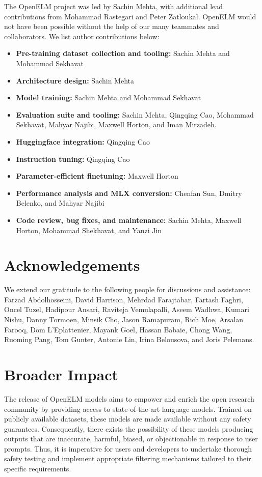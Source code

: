 \documentclass[10pt,twocolumn,letterpaper]{article}
\makeatletter
\newcommand{\model}{OpenELM\@\xspace}
\makeatother
\begin{document}
The \model project was led by Sachin Mehta, with additional lead contributions from Mohammad Rastegari and Peter Zatloukal. \model would not have been possible without the help of our many teammates and collaborators. We list author contributions below:

\begin{itemize}[leftmargin=*]
    \item[] \textbf{Pre-training dataset collection and tooling:} Sachin Mehta and Mohammad Sekhavat
    \item[] \textbf{Architecture design:} Sachin Mehta
    \item[] \textbf{Model training:} Sachin Mehta and Mohammad Sekhavat
    \item[] \textbf{Evaluation suite and tooling:} Sachin Mehta, Qingqing Cao, Mohammad Sekhavat, Mahyar Najibi, Maxwell Horton, and Iman Mirzadeh.
    \item[] \textbf{Huggingface integration:} Qingqing Cao
    \item[] \textbf{Instruction tuning:} Qingqing Cao
    \item[] \textbf{Parameter-efficient finetuning:} Maxwell Horton
    \item[] \textbf{Performance analysis and MLX conversion:} Chenfan Sun, Dmitry Belenko, and Mahyar Najibi
    \item[] \textbf{Code review, bug fixes, and  maintenance:} Sachin Mehta, Maxwell Horton, Mohammad Shekhavat, and Yanzi Jin
\end{itemize}

\section*{Acknowledgements}
We extend our gratitude to the following people for discussions and assistance: Farzad Abdolhosseini, David Harrison, Mehrdad Farajtabar, Fartash Faghri, Oncel Tuzel,  Hadipour Ansari,  Raviteja Vemulapalli, Aseem Wadhwa, Kumari Nishu, Danny Tormoen, Minsik Cho, Jason Ramapuram, Rich Moe, Arsalan Farooq, Dom L'Eplattenier, Mayank Goel, Hassan Babaie, Chong Wang, Ruoming Pang, Tom Gunter, Antonie Lin, Irina Belousova, and Joris Pelemans.

\section*{Broader Impact}
The release of \model models aims to empower and enrich the open research community by providing access to state-of-the-art language models. Trained on publicly available datasets, these models are made available without any safety guarantees. Consequently, there exists the possibility of these models producing outputs that are inaccurate, harmful, biased, or objectionable in response to user prompts. Thus, it is imperative for users and developers to undertake thorough safety testing and implement appropriate filtering mechanisms tailored to their specific requirements.
\end{document}
